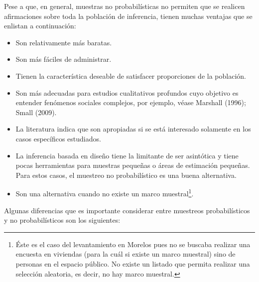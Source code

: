 \documentclass[]{article}
\let\rmarkdownfootnote\footnote%
\def\footnote{\protect\rmarkdownfootnote}
\begin{document}
Pese a que, en general, muestras no probabilísticas no permiten que se
realicen afirmaciones sobre toda la población de inferencia, tienen
muchas ventajas que se enlistan a continuación:

\begin{itemize}
\itemsep1pt\parskip0pt
\item
  Son relativamente más baratas.
\item
  Son más fáciles de administrar.
\item
  Tienen la característica deseable de satisfacer proporciones de la
  población.
\item
  Son más adecuadas para estudios cualitativos profundos cuyo objetivo
  es entender fenómenos sociales complejos, por ejemplo, véase Marshall
  (1996); Small (2009).
\item
  La literatura indica que son apropiadas si se está interesado
  solamente en los casos específicos estudiados.
\item
  La inferencia basada en diseño tiene la limitante de ser asintótica y
  tiene pocas herramientas para muestras pequeñas o áreas de estimación
  pequeñas. Para estos casos, el muestreo no probabilístico es una buena
  alternativa.
\item
  Son una alternativa cuando no existe un marco muestral\footnote{Éste
    es el caso del levantamiento en Morelos pues no se buscaba realizar
    una encuesta en viviendas (para la cuál si existe un marco muestral)
    sino de personas en el espacio público. No existe un listado que
    permita realizar una selección aleatoria, es decir, no hay marco
    muestral.}.
\end{itemize}

Algunas diferencias que es importante considerar entre muestreos
probabilísticos y no probabilísticos son los siguientes:
\end{document}
